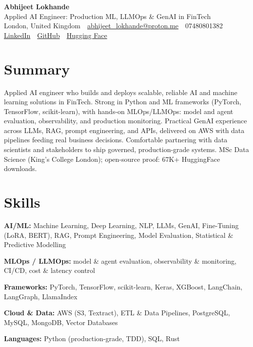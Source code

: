 \documentclass[10pt,a4paper]{article}
\newcommand{\sep}{\,\textcolor{accent!60}{\textbar}\,}
\begin{document}
\begin{center}
  {\fontsize{24}{26}\selectfont\bfseries Abhijeet Lokhande}\\[3pt]
  {\color{accent}\large Applied AI Engineer: Production ML, LLMOps \& GenAI in FinTech}\\[5pt]
  {\small
    London, United Kingdom \sep
    \href{mailto:abhijeet_lokhande@proton.me}{abhijeet\_lokhande@proton.me} \sep
    07480801382 \\[2pt]
    \href{https://www.linkedin.com/in/ablds/}{LinkedIn} \sep
    \href{https://github.com/abhijeetscode}{GitHub} \sep
    \href{https://huggingface.co/ab-ai}{Hugging Face}
  }
\end{center}
\vspace{2pt}

\section{Summary}
Applied AI engineer who builds and deploys scalable, reliable AI and machine learning solutions in FinTech. Strong in Python and ML frameworks (PyTorch, TensorFlow, scikit-learn), with hands-on MLOps/LLMOps: model and agent evaluation, observability, and production monitoring. Practical GenAI experience across LLMs, RAG, prompt engineering, and APIs, delivered on AWS with data pipelines feeding real business decisions. Comfortable partnering with data scientists and stakeholders to ship governed, production-grade systems. MSc Data Science (King's College London); open-source proof: 67K+ HuggingFace downloads.

\section{Skills}
\begin{tight}
  \item[\textcolor{accent}{\small$\bullet$}] \textbf{AI/ML:} Machine Learning, Deep Learning, NLP, LLMs, GenAI, Fine-Tuning (LoRA, BERT), RAG, Prompt Engineering, Model Evaluation, Statistical \& Predictive Modelling
  \item[\textcolor{accent}{\small$\bullet$}] \textbf{MLOps / LLMOps:} model \& agent evaluation, observability \& monitoring, CI/CD, cost \& latency control
  \item[\textcolor{accent}{\small$\bullet$}] \textbf{Frameworks:} PyTorch, TensorFlow, scikit-learn, Keras, XGBoost, LangChain, LangGraph, LlamaIndex
  \item[\textcolor{accent}{\small$\bullet$}] \textbf{Cloud \& Data:} AWS (S3, Textract), ETL \& Data Pipelines, PostgreSQL, MySQL, MongoDB, Vector Databases
  \item[\textcolor{accent}{\small$\bullet$}] \textbf{Languages:} Python (production-grade, TDD), SQL, Rust
\end{tight}
\end{document}
